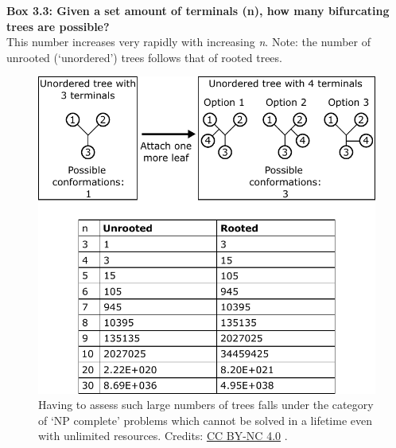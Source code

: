 \begin{framed}
\textbf{Box 3.3: Given a set amount of terminals (n), how many bifurcating trees are possible?}\\
This number increases very rapidly with increasing \textit{n}.
Note: the number of unrooted (`unordered') trees follows that of rooted trees.

% 
% 

\begin{figure}[!htbp]
\centering
\includegraphics[width=1\linewidth]{files/bifurcating_alt-7e792dc6bf0d515c473bc8dd0e1e8453.pdf}
\caption[]{Having to assess such large numbers of trees falls under the category of `NP complete' problems which cannot be solved in a lifetime even with unlimited resources.
Credits: \href{https://creativecommons.org/licenses/by-nc/4.0/}{CC BY-NC 4.0} \cite{own_3_2024}.}
\label{bifurcating_alt}
\end{figure}
\end{framed}

